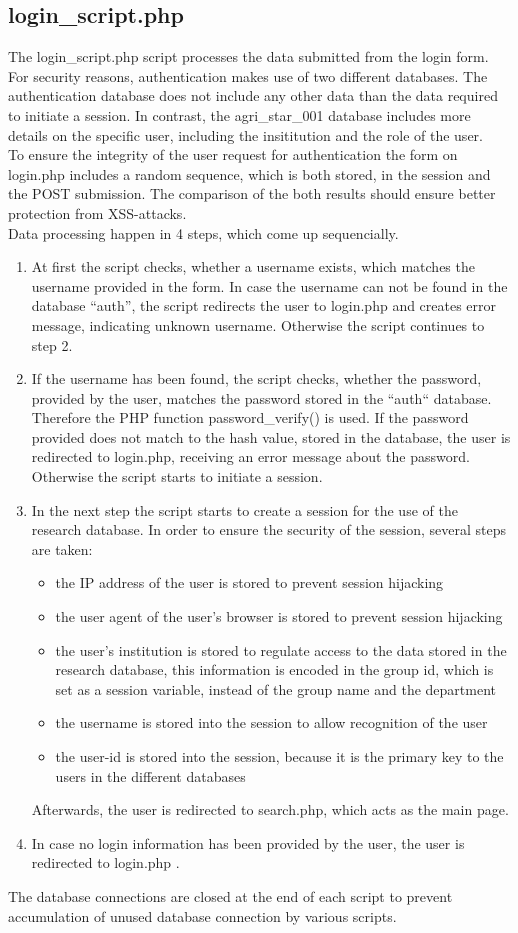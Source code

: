 \subsection{login\_script.php}
The login\_script.php script processes the data submitted from the login form. For security reasons, 
authentication makes use of two different databases. The authentication database does not include any other data than the data required to initiate a session. In contrast,
the agri\_star\_001 database includes more details on the specific user, including the insititution and the role of the user.\\
To ensure the integrity of the user request for authentication the form on login.php includes a random sequence, which is both stored, in the session and the POST submission. 
The comparison of the both results should ensure better protection from XSS-attacks.\\
Data processing happen in 4 steps, which come up sequencially.
\begin{enumerate}
 \item At first the script checks, whether a username exists, which matches the username provided in the form. In case the username can not be found in the database ``auth'', the script
 redirects the user to login.php and creates error message, indicating unknown username. Otherwise the script continues to step 2.
 \item If the username has been found, the script checks, whether the password, provided by the user, matches the password stored in the ``auth`` database. Therefore the PHP function 
 password\_verify() is used. If the password provided does not match to the hash value, stored in the database, the user is redirected to login.php, receiving an error message about the 
 password. Otherwise the script starts to initiate a session.
 \item In the next step the script starts to create a session for the use of the research database. In order to ensure the security of the session, several steps are taken:
 \begin{itemize}
  \item the IP address of the user is stored to prevent session hijacking
  \item the user agent of the user's browser is stored to prevent session hijacking
  \item the user's institution is stored to regulate access to the data stored in the research database, this information is encoded in the group id, which is set as a session
  variable, instead of the group name and the department
  \item the username is stored into the session to allow recognition of the user 
  \item the user-id is stored into the session, because it is the primary key to the users in the different databases
 \end{itemize}
  Afterwards, the user is redirected to search.php, which acts as the main page.
  \item In case no login information has been provided by the user, the user is redirected to login.php .
\end{enumerate}
The database connections are closed at the end of each script to prevent accumulation of unused database connection by various scripts.